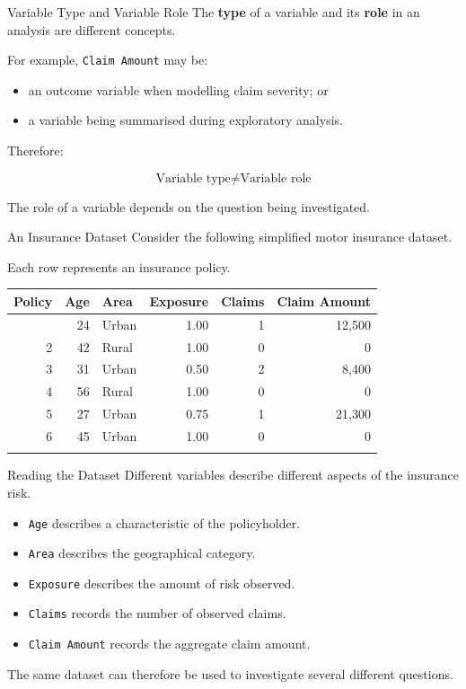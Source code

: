 \documentclass[
  ignorenonframetext,
  aspectratio=169,
]{beamer}
\newcounter{none} %
\providecommand{\tightlist}{%
  \setlength{\itemsep}{0pt}\setlength{\parskip}{0pt}}
\begin{document}
\begin{frame}[fragile]{Variable Type and Variable Role}
\protect{}\label{variable-type-and-variable-role}
The \textbf{type} of a variable and its \textbf{role} in an analysis are
different concepts.

For example, \texttt{Claim\ Amount} may be:

\begin{itemize}
\tightlist
\item
  an outcome variable when modelling claim severity; or
\item
  a variable being summarised during exploratory analysis.
\end{itemize}

Therefore:

\[
\boxed{
\text{Variable type}
\neq
\text{Variable role}
}
\]

The role of a variable depends on the question being investigated.
\end{frame}

\begin{frame}{An Insurance Dataset}
\protect{}\label{an-insurance-dataset}
Consider the following simplified motor insurance dataset.

Each row represents an insurance policy.

{\def\LTcaptype{none} %
\begin{longtable}[]{@{}rrlrrr@{}}
\toprule\noalign{}
Policy & Age & Area & Exposure & Claims & Claim Amount \\
\midrule\noalign{}
\endhead
1 & 24 & Urban & 1.00 & 1 & 12,500 \\
2 & 42 & Rural & 1.00 & 0 & 0 \\
3 & 31 & Urban & 0.50 & 2 & 8,400 \\
4 & 56 & Rural & 1.00 & 0 & 0 \\
5 & 27 & Urban & 0.75 & 1 & 21,300 \\
6 & 45 & Urban & 1.00 & 0 & 0 \\
\bottomrule\noalign{}
\end{longtable}
}
\end{frame}

\begin{frame}[fragile]{Reading the Dataset}
\protect{}\label{reading-the-dataset}
Different variables describe different aspects of the insurance risk.

\begin{itemize}
\tightlist
\item
  \texttt{Age} describes a characteristic of the policyholder.
\item
  \texttt{Area} describes the geographical category.
\item
  \texttt{Exposure} describes the amount of risk observed.
\item
  \texttt{Claims} records the number of observed claims.
\item
  \texttt{Claim\ Amount} records the aggregate claim amount.
\end{itemize}

The same dataset can therefore be used to investigate several different
questions.
\end{frame}
\end{document}
